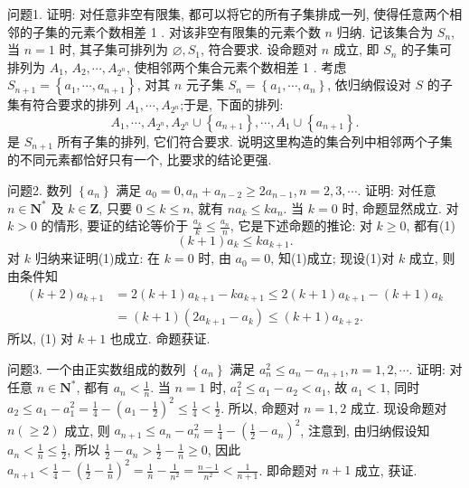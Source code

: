 
问题1. 证明: 对任意非空有限集, 都可以将它的所有子集排成一列, 使得任意两个相邻的子集的元素个数相差 1 .
对该非空有限集的元素个数 $n$ 归纳.
记该集合为 $S_n$, 当 $n=1$ 时, 其子集可排列为 $\varnothing, S_1$, 符合要求.
设命题对 $n$ 成立, 即 $S_n$ 的子集可排列为 $A_1$, $A_2, \cdots, A_{2^n}$, 使相邻两个集合元素个数相差 1 . 考虑 $S_{n+1}=\left\{a_1, \cdots, a_{n+1}\right\}$, 对其 $n$ 元子集 $S_n=\left\{a_1, \cdots, a_n\right\}$, 依归纳假设对 $S$ 的子集有符合要求的排列 $A_1, \cdots, A_{2^n}$;于是, 下面的排列:
$$
A_1, \cdots, A_{2^n}, A_{2^n} \cup\left\{a_{n+1}\right\}, \cdots, A_1 \cup\left\{a_{n+1}\right\} .
$$
是 $S_{n+1}$ 所有子集的排列, 它们符合要求.
说明这里构造的集合列中相邻两个子集的不同元素都恰好只有一个, 比要求的结论更强.



问题2. 数列 $\left\{a_n\right\}$ 满足 $a_0=0, a_n+a_{n-2} \geqslant 2 a_{n-1}, n=2,3, \cdots$.
证明: 对任意 $n \in \mathbf{N}^*$ 及 $k \in \mathbf{Z}$, 只要 $0 \leqslant k \leqslant n$, 就有 $n a_k \leqslant k a_n$.
当 $k=0$ 时, 命题显然成立.
对 $k>0$ 的情形, 要证的结论等价于 $\frac{a_k}{k} \leqslant \frac{a_n}{n}$, 它是下述命题的推论: 对 $k \geqslant 0$, 都有(1)
$$
(k+1) a_k \leqslant k a_{k+1} .
$$
对 $k$ 归纳来证明(1)成立: 在 $k=0$ 时, 由 $a_0=0$, 知(1)成立; 现设(1)对 $k$ 成立, 则由条件知
$$
\begin{aligned}
(k+2) a_{k+1} & =2(k+1) a_{k+1}-k a_{k+1} \leqslant 2(k+1) a_{k+1}-(k+1) a_k \\
& =(k+1)\left(2 a_{k+1}-a_k\right) \leqslant(k+1) a_{k+2} .
\end{aligned}
$$
所以, (1) 对 $k+1$ 也成立.
命题获证.



问题3. 一个由正实数组成的数列 $\left\{a_n\right\}$ 满足 $a_n^2 \leqslant a_n-a_{n+1}, n=1,2, \cdots$. 证明: 对任意 $n \in \mathbf{N}^*$, 都有 $a_n<\frac{1}{n}$.
当 $n=1$ 时, $a_1^2 \leqslant a_1-a_2<a_1$, 故 $a_1<1$, 同时 $a_2 \leqslant a_1-a_1^2=\frac{1}{4}- \left(a_1-\frac{1}{2}\right)^2 \leqslant \frac{1}{4}<\frac{1}{2}$. 所以, 命题对 $n=1,2$ 成立.
现设命题对 $n(\geqslant 2)$ 成立,
则 $a_{n+1} \leqslant a_n-a_n^2=\frac{1}{4}-\left(\frac{1}{2}-a_n\right)^2$, 注意到, 由归纳假设知 $a_n<\frac{1}{n} \leqslant \frac{1}{2}$, 所以 $\frac{1}{2}-a_n>\frac{1}{2}-\frac{1}{n} \geqslant 0$, 因此 $a_{n+1}<\frac{1}{4}-\left(\frac{1}{2}-\frac{1}{n}\right)^2=\frac{1}{n}-\frac{1}{n^2}=\frac{n-1}{n^2}< \frac{1}{n+1}$. 即命题对 $n+1$ 成立, 获证.



